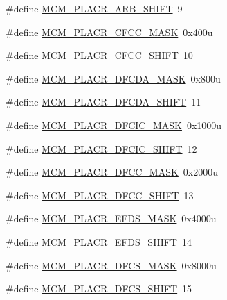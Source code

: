 \begin{DoxyCompactItemize}
\item 
\#define \hyperlink{group___m_c_m___register___masks_ga074aa7cf18e97a20994af9c9f1151873}{M\+C\+M\+\_\+\+P\+L\+A\+C\+R\+\_\+\+A\+R\+B\+\_\+\+S\+H\+I\+FT}~9
\item 
\#define \hyperlink{group___m_c_m___register___masks_gacbfd3b84d50859b667b4c8c8923893c6}{M\+C\+M\+\_\+\+P\+L\+A\+C\+R\+\_\+\+C\+F\+C\+C\+\_\+\+M\+A\+SK}~0x400u
\item 
\#define \hyperlink{group___m_c_m___register___masks_ga278b7f999d641bc9c3ab1c7c6d28e8cb}{M\+C\+M\+\_\+\+P\+L\+A\+C\+R\+\_\+\+C\+F\+C\+C\+\_\+\+S\+H\+I\+FT}~10
\item 
\#define \hyperlink{group___m_c_m___register___masks_gae6459088afbbf9bcb5bf4e5eb88f239c}{M\+C\+M\+\_\+\+P\+L\+A\+C\+R\+\_\+\+D\+F\+C\+D\+A\+\_\+\+M\+A\+SK}~0x800u
\item 
\#define \hyperlink{group___m_c_m___register___masks_ga9834def64562d8851ba0500d81ae2a16}{M\+C\+M\+\_\+\+P\+L\+A\+C\+R\+\_\+\+D\+F\+C\+D\+A\+\_\+\+S\+H\+I\+FT}~11
\item 
\#define \hyperlink{group___m_c_m___register___masks_ga4a3f9ffb612145266536e0de8e9fa432}{M\+C\+M\+\_\+\+P\+L\+A\+C\+R\+\_\+\+D\+F\+C\+I\+C\+\_\+\+M\+A\+SK}~0x1000u
\item 
\#define \hyperlink{group___m_c_m___register___masks_gaff851bbdb5438d7e6c4816866107aec0}{M\+C\+M\+\_\+\+P\+L\+A\+C\+R\+\_\+\+D\+F\+C\+I\+C\+\_\+\+S\+H\+I\+FT}~12
\item 
\#define \hyperlink{group___m_c_m___register___masks_ga3a3b01206691dd0da2cc1699d7aff12f}{M\+C\+M\+\_\+\+P\+L\+A\+C\+R\+\_\+\+D\+F\+C\+C\+\_\+\+M\+A\+SK}~0x2000u
\item 
\#define \hyperlink{group___m_c_m___register___masks_ga43547ea594fc5be9183ff24f3bdcdee7}{M\+C\+M\+\_\+\+P\+L\+A\+C\+R\+\_\+\+D\+F\+C\+C\+\_\+\+S\+H\+I\+FT}~13
\item 
\#define \hyperlink{group___m_c_m___register___masks_ga90eea584eb5978a2ddfee057cd2fec28}{M\+C\+M\+\_\+\+P\+L\+A\+C\+R\+\_\+\+E\+F\+D\+S\+\_\+\+M\+A\+SK}~0x4000u
\item 
\#define \hyperlink{group___m_c_m___register___masks_gab4f3cedc3a9560ddb10ca0cddaab74dd}{M\+C\+M\+\_\+\+P\+L\+A\+C\+R\+\_\+\+E\+F\+D\+S\+\_\+\+S\+H\+I\+FT}~14
\item 
\#define \hyperlink{group___m_c_m___register___masks_ga336a7d6634a1b5f72698ee41e1768d08}{M\+C\+M\+\_\+\+P\+L\+A\+C\+R\+\_\+\+D\+F\+C\+S\+\_\+\+M\+A\+SK}~0x8000u
\item 
\#define \hyperlink{group___m_c_m___register___masks_gab9eab0c37b97341f1af2e72ec3c299e6}{M\+C\+M\+\_\+\+P\+L\+A\+C\+R\+\_\+\+D\+F\+C\+S\+\_\+\+S\+H\+I\+FT}~15

\end{DoxyCompactItemize}
